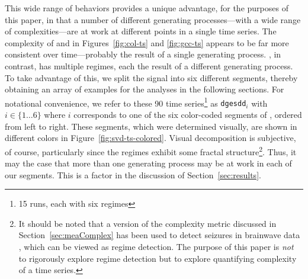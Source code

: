 This wide range of behaviors provides a unique advantage, for the
purposes of this paper, in that a number of different generating
processes---with a wide range of complexities---are at work at
different points in a single time series.  The complexity of \col and
\gcc in Figures~\ref{fig:col-ts} and \ref{fig:gcc-ts} appears to be
far more consistent over time---probably the result of a single
generating process.  \svd, in contrast, has multiple regimes, each the
result of a different generating process.  To take advantage of this,
we split the signal into six different segments, thereby obtaining an
array of examples for the analyses in the following sections.  For
notational convenience, we refer to these 90 time series\footnote{15
  runs, each with six regimes} as {\tt dgesdd$_i$} with $i \in
\{1\dots6\}$ where $i$ corresponds to one of the six color-coded
segments of \svd, ordered from left to right.  These segments, which
were determined visually, are shown in different colors in
Figure~\ref{fig:svd-ts-colored}.  Visual decomposition is subjective,
of course, particularly since the regimes exhibit some fractal
structure\footnote{It should be noted that a version of the complexity
  metric discussed in Section~\ref{sec:meaComplex} has been used to
  detect seizures in brainwave data \cite{cao2004det}, which can be
  viewed as regime detection.  The purpose of this paper is \emph{not}
  to rigorously explore regime detection but to explore quantifying
  complexity of a time series.}.  Thus, it may the case that more than
one generating process may be at work in each of our segments.  This
is a factor in the discussion of Section~\ref{sec:results}.

